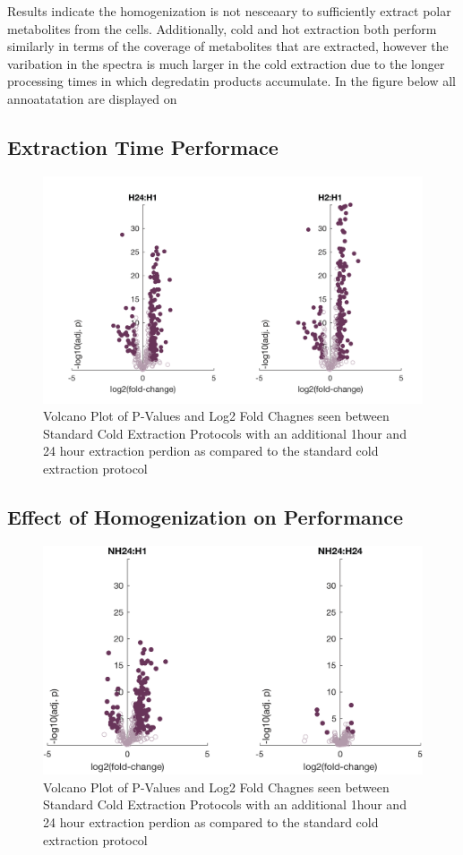 \documentclass[a4paper]{article}
\begin{document}
Results indicate the homogenization is not nesceaary to sufficiently extract polar metabolites from the cells. Additionally, cold and hot extraction both perform similarly in terms of the coverage of metabolites that are extracted, however the varibation in the spectra is much larger in the cold extraction due to the longer processing times in which degredatin products accumulate. In the figure below all annoatatation are displayed on 

\subsection{Extraction Time Performace}
\begin{figure}[H]
	\centering
	\includegraphics[width=0.7\linewidth]{H1-H24-H2-01}
	\caption{Volcano Plot of P-Values and Log2 Fold Chagnes seen between Standard Cold Extraction Protocols with an additional 1hour and 24 hour extraction perdion as compared to the standard cold extraction protocol}
	\label{fig:h1-h24-h2-01}
\end{figure}

\subsection{Effect of Homogenization on Performance}
\begin{figure}[H]
	\centering
	\includegraphics[width=0.7\linewidth]{NH24}
	\caption{Volcano Plot of P-Values and Log2 Fold Chagnes seen between Standard Cold Extraction Protocols with an additional 1hour and 24 hour extraction perdion as compared to the standard cold extraction protocol}
	\label{fig:nh24}
\end{figure}
\end{document}
